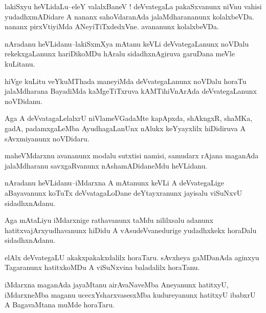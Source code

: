 \documentclass{article}
\begin{document}
\begin{mn}%
lakiSxyu heVLidaLu--eleY valalxBaneV ! deVvategaLa pakaSxvanunx niVnu vahisi yudadhxmADidare 
A nananx sahoVdaranAda jalaMdharananunx kolalxbeVDa. nananx pirxVtiyiMda ANeyiTiTxdedxVne. 
avananunx kolalxbeVDa.
\end{mn}

\begin{mn}%
nAradanu heVLidanu--lakiSxmXya mAtanu keVLi deVvategaLanunx noVDalu rekekxgaLanunx 
hariDikoMDu hAralu sidadhxnAgiruva garuDana meVle kuLitanu.
\end{mn}

\begin{mn}%
hiVge kuLitu veYkuMThada maneyiMda deVvategaLanunx noVDalu horaTu jalaMdharana BayadiMda 
kaMgeTiTxruva kAMTihiVnArAda deVvategaLanunx noVDidanu.
\end{mn}

\begin{mn}%
Aga A deVvatagaLelalxrU niVlameVGadaMte kapApxda, shAkngxR, shaMKa, gadA, padamxgaLeMba 
AyudhagaLanUnx nAlukx keYyayxlilx hiDidiruva A sAvxmiyanunx noVDidaru.
\end{mn}

\begin{mn}%
maheVMdarxnu avananunx modalu sutxtisi namisi, samudarx rAjana maganAda jalaMdharanu 
savxgaRvanunx nAshamADidaneMdu heVLidanu.
\end{mn}

\begin{mn}%
nAradanu heVLidanu--iMdarxna A mAtanunx keVLi A deVvategaLige aBayavanunx koTuTx 
deVvatagaLoDane deYtayxranunx jayisalu viSuNxvU sidadhxnAdanu.
\end{mn}

\begin{mn}%
Aga mAtaLiyu iMdarxnige rathavanunx taMdu nililxsalu adanunx hatitxvajArxyudhavanunx hiDidu 
A vAsudeVvanedurige yudadhxkekx horaDalu sidadhxnAdanu.
\end{mn}

\begin{mn}%
elAlx deVvategaLU akakxpakakxdalilx horaTaru. sAvxheya gaMDanAda aginxyu Tagaranunx 
hatitxkoMDu A viSuNxvina baladalilx horaTanu.
\end{mn}

\begin{mn}%
iMdarxna maganAda jayaMtanu airAvaNaveMba Aneyanunx hatitxyU, iMdarxneMba maganu 
ucecxYsharxvasesxMba kudureyanunx hatitxyU ibabxrU A BagavaMtana muMde horaTaru.
\end{mn}
\end{document}
